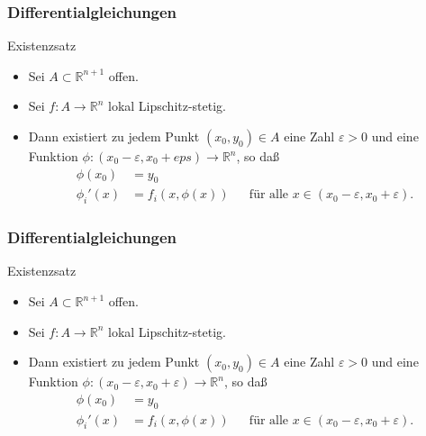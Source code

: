 \documentclass{beamer}
\newcommand\RR{\mathbb R}
\newcommand{\eps}{\varepsilon}
\newcommand{\ue}{\"u}
\newcommand{\mytitle}{Differentialgleichungen}
\begin{document}
\begin{frame}\frametitle{\mytitle}
	\begin{block}{Existenzsatz}
		\begin{itemize}
			\item Sei $A\subset\RR^{n+1}$ offen.
			\item Sei $f:A\to\RR^n$ lokal Lipschitz-stetig.
			\item Dann existiert zu jedem Punkt $(x_0,y_0)\in A$ eine Zahl $\eps>0$ und eine Funktion $\phi:(x_0-\eps,x_0+eps)\to\RR^n$, so da\ss
				\begin{align*}
					\phi(x_0)&=y_0\\
					\phi_i'(x)&=f_i(x,\phi(x))&&\mbox{f\ue r alle }x\in(x_0-\eps,x_0+\eps).
				\end{align*}
		\end{itemize}
	\end{block}
\end{frame}

\begin{frame}\frametitle{\mytitle}
	\begin{block}{Existenzsatz}
		\begin{itemize}
			\item Sei $A\subset\RR^{n+1}$ offen.
			\item Sei $f:A\to\RR^n$ lokal Lipschitz-stetig.
			\item Dann existiert zu jedem Punkt $(x_0,y_0)\in A$ eine Zahl $\eps>0$ und eine Funktion $\phi:(x_0-\eps,x_0+\eps)\to\RR^n$, so da\ss
				\begin{align*}
					\phi(x_0)&=y_0\\
					\phi_i'(x)&=f_i(x,\phi(x))&&\mbox{f\ue r alle }x\in(x_0-\eps,x_0+\eps).
				\end{align*}
		\end{itemize}
	\end{block}
\end{frame}
\end{document}
